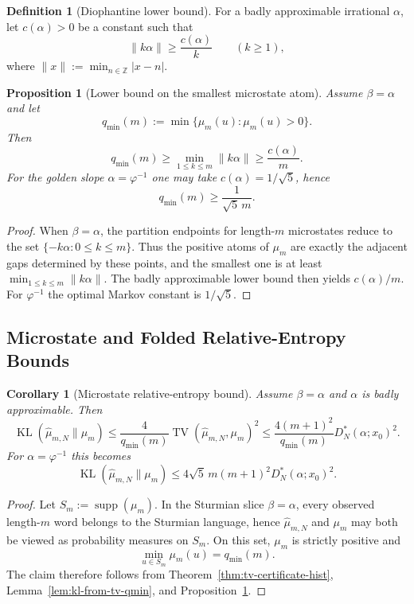 \documentclass[11pt,letterpaper]{article}
\numberwithin{equation}{section}
\theoremstyle{plain}
\newtheorem{proposition}[theorem]{Proposition}
\newtheorem{corollary}[theorem]{Corollary}
\theoremstyle{definition}
\newtheorem{definition}[theorem]{Definition}
\theoremstyle{remark}
\DeclareMathOperator{\TV}{TV}
\DeclareMathOperator{\KL}{KL}
\DeclareMathOperator{\supp}{supp}
\begin{document}
\begin{definition}[Diophantine lower bound]
For a badly approximable irrational $\alpha$, let $c(\alpha)>0$ be a constant
such that
\[
\|k\alpha\|\ge \frac{c(\alpha)}{k}\qquad (k\ge 1),
\]
where $\|x\|:=\min_{n\in\mathbb{Z}}|x-n|$.
\end{definition}

\begin{proposition}[Lower bound on the smallest microstate atom]\label{prop:qmin-lowerbound-markov}
Assume $\beta=\alpha$ and let
\[
q_{\min}(m):=\min\{\mu_m(u):\mu_m(u)>0\}.
\]
Then
\[
q_{\min}(m)\ge \min_{1\le k\le m}\|k\alpha\|\ge \frac{c(\alpha)}{m}.
\]
For the golden slope $\alpha=\varphi^{-1}$ one may take
$c(\alpha)=1/\sqrt5$, hence
\[
q_{\min}(m)\ge \frac{1}{\sqrt5\,m}.
\]
\end{proposition}

\begin{proof}
When $\beta=\alpha$, the partition endpoints for length-$m$ microstates reduce
to the set $\{-k\alpha:0\le k\le m\}$.  Thus the positive atoms of $\mu_m$ are
exactly the adjacent gaps determined by these points, and the smallest one is
at least $\min_{1\le k\le m}\|k\alpha\|$.  The badly approximable lower bound
then yields $c(\alpha)/m$.  For $\varphi^{-1}$ the optimal Markov constant is
$1/\sqrt5$.
\end{proof}

\subsection{Microstate and Folded Relative-Entropy Bounds}

\begin{corollary}[Microstate relative-entropy bound]\label{cor:rotation-microstate-kl-certificate}
Assume $\beta=\alpha$ and $\alpha$ is badly approximable.  Then
\[
\KL(\hat\mu_{m,N}\|\mu_m)
\le
\frac{4}{q_{\min}(m)}\TV(\hat\mu_{m,N},\mu_m)^2
\le
\frac{4(m+1)^2}{q_{\min}(m)}D_N^*(\alpha;x_0)^2.
\]
For $\alpha=\varphi^{-1}$ this becomes
\[
\KL(\hat\mu_{m,N}\|\mu_m)
\le
4\sqrt5\,m(m+1)^2 D_N^*(\alpha;x_0)^2.
\]
\end{corollary}

\begin{proof}
Let \(S_m:=\supp(\mu_m)\). In the Sturmian slice \(\beta=\alpha\), every
observed length-\(m\) word belongs to the Sturmian language, hence
\(\hat\mu_{m,N}\) and \(\mu_m\) may both be viewed as probability measures on
\(S_m\). On this set, \(\mu_m\) is strictly positive and
\[
\min_{u\in S_m}\mu_m(u)=q_{\min}(m).
\]
The claim therefore follows from Theorem~\ref{thm:tv-certificate-hist},
Lemma~\ref{lem:kl-from-tv-qmin}, and
Proposition~\ref{prop:qmin-lowerbound-markov}.
\end{proof}
\end{document}
